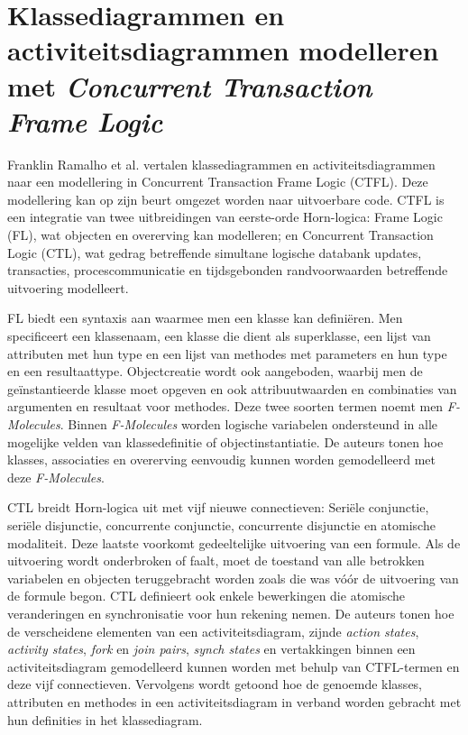 \section{Klassediagrammen en activiteitsdiagrammen modelleren met \textit{Concurrent Transaction Frame Logic}}

Franklin Ramalho et al.\cite{RamalhoFranklin2004CTFL} vertalen klassediagrammen en activiteitsdiagrammen\cite{RumbaughJames2005Tuml} naar een modellering in Concurrent Transaction Frame Logic\cite{kifer1995deductive,kifer1996concurrency} (CTFL). Deze modellering kan op zijn beurt omgezet worden naar uitvoerbare code. CTFL is een integratie van twee uitbreidingen van eerste-orde Horn-logica: Frame Logic (FL), wat objecten en overerving kan modelleren; en Concurrent Transaction Logic (CTL), wat gedrag betreffende simultane logische databank updates, transacties, procescommunicatie en tijdsgebonden randvoorwaarden betreffende uitvoering modelleert.

FL biedt een syntaxis aan waarmee men een klasse kan defini\"eren. Men specificeert een klassenaam, een klasse die dient als superklasse, een lijst van attributen met hun type en een lijst van methodes met parameters en hun type en een resultaattype. Objectcreatie wordt ook aangeboden, waarbij men de ge\"instantieerde klasse moet opgeven en ook attribuutwaarden en combinaties van argumenten en resultaat voor methodes. Deze twee soorten termen noemt men \textit{F-Molecules}. Binnen \textit{F-Molecules} worden logische variabelen ondersteund in alle mogelijke velden van klassedefinitie of objectinstantiatie. De auteurs tonen hoe klasses, associaties en overerving eenvoudig kunnen worden gemodelleerd met deze \textit{F-Molecules}.

CTL breidt Horn-logica uit met vijf nieuwe connectieven: Seri\"ele conjunctie, seri\"ele disjunctie, concurrente conjunctie, concurrente disjunctie en atomische modaliteit. Deze laatste voorkomt gedeeltelijke uitvoering van een formule. Als de uitvoering wordt onderbroken of faalt, moet de toestand van alle betrokken variabelen en objecten teruggebracht worden zoals die was v\'o\'or de uitvoering van de formule begon. CTL definieert ook enkele bewerkingen die atomische veranderingen en synchronisatie voor hun rekening nemen. De auteurs tonen hoe de verscheidene elementen van een activiteitsdiagram, zijnde \textit{action states}, \textit{activity states}, \textit{fork} en \textit{join pairs}, \textit{synch states} en vertakkingen binnen een activiteitsdiagram gemodelleerd kunnen worden met behulp van CTFL-termen en deze vijf connectieven. Vervolgens wordt getoond hoe de genoemde klasses, attributen en methodes in een activiteitsdiagram in verband worden gebracht met hun definities in het klassediagram.

